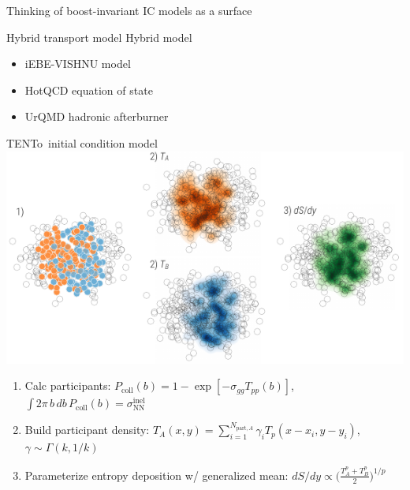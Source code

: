 \documentclass[xcolor=dvipsnames]{beamer}
\newcommand{\trento}{T\raisebox{-0.5ex}{R}ENTo}
\begin{document}
\begin{frame}{Thinking of boost-invariant IC models as a surface}
\end{frame}

\begin{frame}{Hybrid transport model}
    Hybrid model \\
    \begin{itemize}
        \item iEBE-VISHNU model
        \item HotQCD equation of state
        \item UrQMD hadronic afterburner
    \end{itemize}
\end{frame}

\begin{frame}{\trento\ initial condition model }
    \vspace{.6 cm}
    \includegraphics{schematic} \\
    \begin{enumerate}
        \scriptsize
        \item Calc participants: $P_\text{coll}(b) = 1 - \exp[-\sigma_{gg} T_{pp}(b)]$, \quad $\int 2 \pi\, b\, db\, P_\text{coll}(b) = \sigma_\text{NN}^\text{inel}$ \\ \vspace{0.1 cm}
        \item Build participant density: $T_A(x,y) = \sum\limits_{i=1}^{N_{\text{part},A}} \gamma_i T_p(x-x_i, y-y_i)$, \quad $\gamma \sim \Gamma(k, 1/k)$ \\
        \item Parameterize entropy deposition w/ generalized mean: $dS/dy \propto \bigg(\frac{T_A^p + T_B^p}{2} \bigg)^{1/p}$
    \end{enumerate}
\end{frame}
\end{document}
